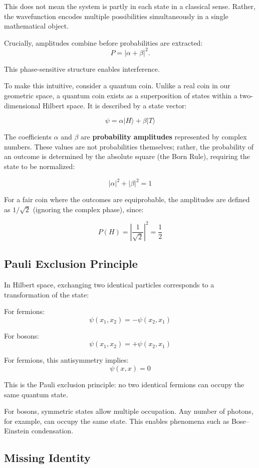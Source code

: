 This does not mean the system is partly in each state in a classical sense. Rather, the wavefunction encodes multiple possibilities simultaneously in a single mathematical object.

Crucially, amplitudes combine before probabilities are extracted:
\[
P = |\alpha + \beta|^2.
\]

This phase-sensitive structure enables interference.

To make this intuitive, consider a quantum coin. Unlike a real coin in our geometric space, a quantum coin exists as a superposition of states within a two-dimensional Hilbert space. It is described by a state vector:

\[
\psi = \alpha |H\rangle + \beta |T\rangle
\]

The coefficients $\alpha$ and $\beta$ are \textbf{probability amplitudes} represented by complex numbers.
These values are not probabilities themselves; rather, the probability of an outcome is determined by the absolute square (the Born Rule), requiring the state to be normalized:

\[
|\alpha|^2 + |\beta|^2 = 1
\]

For a fair coin where the outcomes are equiprobable, the amplitudes are defined as $1/\sqrt{2}$ (ignoring the complex phase), since:

\[
P(H) = \left| \frac{1}{\sqrt{2}} \right|^2 = \frac{1}{2}
\]


\subsection*{Pauli Exclusion Principle}

In Hilbert space, exchanging two identical particles corresponds to a transformation of the state:

For fermions:
\[
\psi(x_1, x_2) = -\psi(x_2, x_1)
\]

For bosons:
\[
\psi(x_1, x_2) = +\psi(x_2, x_1)
\]

For fermions, this antisymmetry implies:
\[
\psi(x,x) = 0
\]

This is the Pauli exclusion principle: no two identical fermions can occupy the same quantum state.

For bosons, symmetric states allow multiple occupation. Any number of photons, for example, can occupy the same state.
This enables phenomena such as Bose–Einstein condensation.


\subsection*{Missing Identity}

